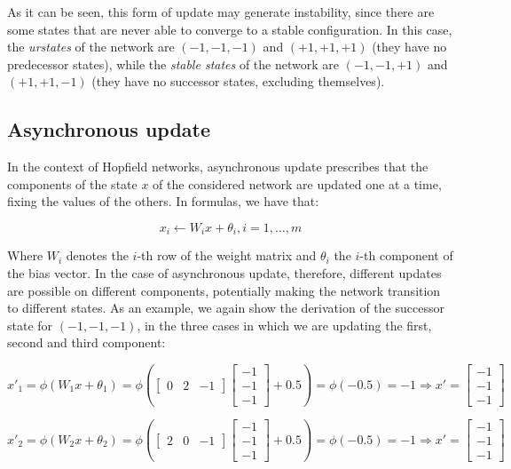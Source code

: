 \documentclass[letterpaper,headings=standardclasses]{scrartcl}
\begin{document}
As it can be seen, this form of update may generate instability, since there are some states that are never able to converge to a stable configuration. In this case, the \emph{urstates} of the network are $(-1, -1, -1)$ and $(+1, +1, +1)$ (they have no predecessor states), while the \emph{stable states} of the network are $(-1, -1, +1)$ and $(+1, +1, -1)$ (they have no successor states, excluding themselves).

\subsection{Asynchronous update}

In the context of Hopfield networks, asynchronous update prescribes that the components of the state $x$ of the considered network are updated one at a time, fixing the values of the others. In formulas, we have that:

$$ x_i \leftarrow W_i x + \theta_i, i = 1, \dots, m $$

Where $W_i$ denotes the $i$-th row of the weight matrix and $\theta_i$ the $i$-th component of the bias vector. In the case of asynchronous update, therefore, different updates are possible on different components, potentially making the network transition to different states. As an example, we again show the derivation of the successor state for $(-1, -1, -1)$, in the three cases in which we are updating the first, second and third component:

$$ x'_{1} = \phi(W_1 x + \theta_1) = \phi \left( \left[ \begin{matrix} 0 & 2 & -1 \end{matrix} \right] \left[ \begin{matrix} -1 \\ -1 \\ -1 \end{matrix} \right] + 0.5 \right) = \phi \left( -0.5 \right) = -1 \Rightarrow x' = \left[ \begin{matrix} -1 \\ -1 \\ -1 \end{matrix} \right] $$

$$ x'_{2} = \phi(W_2 x + \theta_2) = \phi \left( \left[ \begin{matrix} 2 & 0 & -1 \end{matrix} \right] \left[ \begin{matrix} -1 \\ -1 \\ -1 \end{matrix} \right] + 0.5 \right) = \phi \left( -0.5 \right) = -1 \Rightarrow x' = \left[ \begin{matrix} -1 \\ -1 \\ -1 \end{matrix} \right] $$
\end{document}
